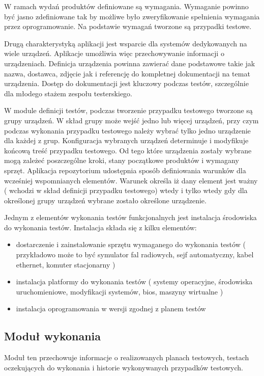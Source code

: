 W ramach wydań produktów definiowane są wymagania. Wymaganie powinno być jasno zdefiniowane tak by możliwe było zweryfikowanie spełnienia wymagania przez oprogramowanie. Na podstawie wymagań tworzone są przypadki testowe.

Drugą charakterystyką aplikacji jest wsparcie dla systemów dedykowanych na wiele urządzeń. Aplikacje umożliwia więc przechowywanie informacji o urządzeniach. Definicja urządzenia powinna zawierać dane podstawowe takie jak nazwa, dostawca, zdjęcie jak i referencję do kompletnej dokumentacji na temat urządzenia. Dostęp do dokumentacji jest kluczowy podczas testów, szczególnie dla młodego stażem zespołu testerskiego.

W module definicji testów, podczas tworzenie przypadku testowego tworzone są grupy urządzeń. W skład grupy może wejść jedno lub więcej urządzeń, przy czym podczas wykonania przypadku testowego należy wybrać tylko jedno urządzenie dla każdej z grup. Konfiguracja wybranych urządzeń determinuje i modyfikuje końcową treść przypadku testowego. Od tego które urządzenia zostały wybrane mogą zależeć poszczególne kroki, stany początkowe produktów i wymagany sprzęt. Aplikacja repozytorium udostępnia sposób definiowania warunków dla wcześniej wspomnianych elementów. Warunek określa iż dany element jest ważny ( wchodzi w skład definicji przypadku testowego) wtedy i tylko wtedy gdy dla określonej grupy urządzeń wybrane zostało określone urządzenie.

Jednym z elementów wykonania testów funkcjonalnych jest instalacja środowiska do wykonania testów. Instalacja składa się z kilku elementów:
\begin{itemize}
  \item dostarczenie i zainstalowanie sprzętu wymaganego do wykonania testów ( przykładowo może to być symulator fal radiowych, sejf automatyczny, kabel ethernet, komuter stacjonarny )
  \item instalacja platformy do wykonania testów ( systemy operacyjne, środowiska uruchomieniowe, modyfikacji systemów, bios, maszyny wirtualne )
  \item instalacja oprogramowania w wersji zgodnej z planem testów
\end{itemize}

\subsection{Moduł wykonania }

Moduł ten przechowuje informacje o realizowanych planach testowych, testach oczekujących do wykonania i historie wykonywanych przypadków testowych.

